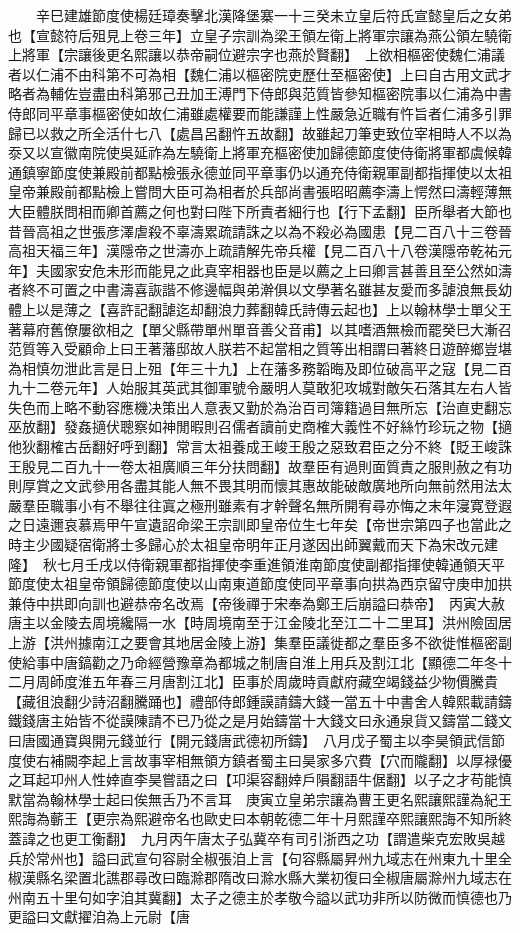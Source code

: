 　　辛巳建雄節度使楊廷璋奏擊北漢降堡寨一十三癸未立皇后符氏宣懿皇后之女弟也【宣懿符后殂見上卷三年】立皇子宗訓為梁王領左衛上將軍宗讓為燕公領左驍衛上將軍【宗讓後更名熙讓以恭帝嗣位避宗字也燕於賢翻】　上欲相樞密使魏仁浦議者以仁浦不由科第不可為相【魏仁浦以樞密院吏歷仕至樞密使】上曰自古用文武才略者為輔佐豈盡由科第邪己丑加王溥門下侍郎與范質皆參知樞密院事以仁浦為中書侍郎同平章事樞密使如故仁浦雖處權要而能謙謹上性嚴急近職有忤旨者仁浦多引罪歸已以救之所全活什七八【處昌呂翻忤五故翻】故雖起刀筆吏致位宰相時人不以為沗又以宣徽南院使吳延祚為左驍衛上將軍充樞密使加歸德節度使侍衛將軍都虞候韓通鎮寧節度使兼殿前都點檢張永德並同平章事仍以通充侍衛親軍副都指揮使以太祖皇帝兼殿前都點檢上嘗問大臣可為相者於兵部尚書張昭昭薦李濤上愕然曰濤輕薄無大臣體朕問相而卿首薦之何也對曰陛下所責者細行也【行下孟翻】臣所舉者大節也昔晉高祖之世張彦澤虐殺不辜濤累疏請誅之以為不殺必為國患【見二百八十三卷晉高祖天福三年】漢隱帝之世濤亦上疏請解先帝兵權【見二百八十八卷漢隱帝乾祐元年】夫國家安危未形而能見之此真宰相器也臣是以薦之上曰卿言甚善且至公然如濤者終不可置之中書濤喜詼諧不修邊幅與弟澣俱以文學著名雖甚友愛而多謔浪無長幼體上以是薄之【喜許記翻謔迄却翻浪力葬翻韓氏詩傳云起也】上以翰林學士單父王著幕府舊僚屢欲相之【單父縣帶單州單音善父音甫】以其嗜酒無檢而罷癸巳大漸召范質等入受顧命上曰王著藩邸故人朕若不起當相之質等出相謂曰著終日遊醉鄉豈堪為相慎勿泄此言是日上殂【年三十九】上在藩多務韜晦及即位破高平之寇【見二百九十二卷元年】人始服其英武其御軍號令嚴明人莫敢犯攻城對敵矢石落其左右人皆失色而上略不動容應機决策出人意表又勤於為治百司簿籍過目無所忘【治直吏翻忘巫放翻】發姦擿伏聰察如神閒暇則召儒者讀前史商榷大義性不好絲竹珍玩之物【擿他狄翻榷古岳翻好呼到翻】常言太祖養成王峻王殷之惡致君臣之分不終【貶王峻誅王殷見二百九十一卷太祖廣順三年分扶問翻】故羣臣有過則面質責之服則赦之有功則厚賞之文武參用各盡其能人無不畏其明而懷其惠故能破敵廣地所向無前然用法太嚴羣臣職事小有不舉往往寘之極刑雖素有才幹聲名無所開宥尋亦悔之末年寖寛登遐之日遠邇哀慕焉甲午宣遺詔命梁王宗訓即皇帝位生七年矣【帝世宗第四子也當此之時主少國疑宿衛將士多歸心於太祖皇帝明年正月遂因出師翼戴而天下為宋改元建隆】　秋七月壬戌以侍衛親軍都指揮使李重進領淮南節度使副都指揮使韓通領天平節度使太祖皇帝領歸德節度使以山南東道節度使同平章事向拱為西京留守庚申加拱兼侍中拱即向訓也避恭帝名改焉【帝後禪于宋奉為鄭王后崩謚曰恭帝】　丙寅大赦　唐主以金陵去周境纔隔一水【時周境南至于江金陵北至江二十二里耳】洪州險固居上游【洪州據南江之要會其地居金陵上游】集羣臣議徙都之羣臣多不欲徙惟樞密副使給事中唐鎬勸之乃命經營豫章為都城之制唐自淮上用兵及割江北【顯德二年冬十二月周師度淮五年春三月唐割江北】臣事於周歲時貢獻府藏空竭錢益少物價騰貴【藏徂浪翻少詩沼翻騰踊也】禮部侍郎鍾謨請鑄大錢一當五十中書舍人韓熙載請鑄鐵錢唐主始皆不從謨陳請不已乃從之是月始鑄當十大錢文曰永通泉貨又鑄當二錢文曰唐國通寶與開元錢並行【開元錢唐武德初所鑄】　八月戊子蜀主以李昊領武信節度使右補闕李起上言故事宰相無領方鎮者蜀主曰昊家多穴費【穴而隴翻】以厚禄優之耳起卭州人性婞直李昊嘗語之曰【卭渠容翻婞戶隕翻語牛倨翻】以子之才苟能慎默當為翰林學士起曰俟無舌乃不言耳　庚寅立皇弟宗讓為曹王更名熙讓熙謹為紀王熙誨為蘄王【更宗為熙避帝名也歐史曰本朝乾德二年十月熙謹卒熙讓熙誨不知所終蓋諱之也更工衡翻】　九月丙午唐太子弘冀卒有司引浙西之功【謂遣柴克宏敗吳越兵於常州也】謚曰武宣句容尉全椒張洎上言【句容縣屬昇州九域志在州東九十里全椒漢縣名梁置北譙郡尋改曰臨滁郡隋改曰滁水縣大業初復曰全椒唐屬滁州九域志在州南五十里句如字洎其冀翻】太子之德主於孝敬今謚以武功非所以防微而慎德也乃更謚曰文獻擢洎為上元尉【唐